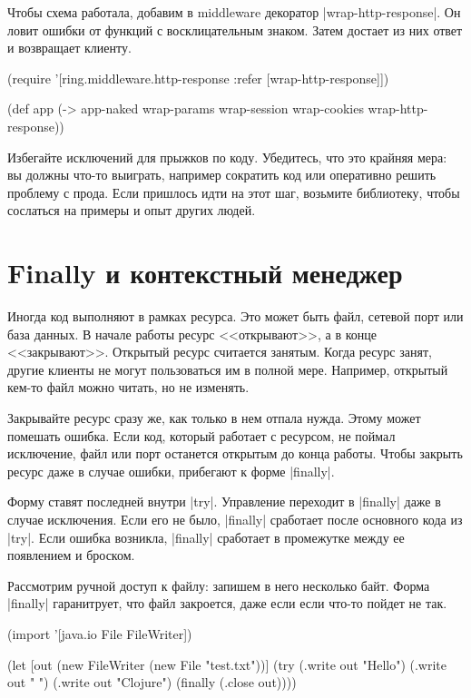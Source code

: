 Чтобы схема работала, добавим в middleware декоратор
\spverb|wrap-http-response|. Он ловит ошибки от функций с восклицательным
знаком. Затем достает из них ответ и возвращает клиенту.

\begin{english}
  \begin{clojure}
(require '[ring.middleware.http-response
           :refer [wrap-http-response]])

(def app
  (-> app-naked
      wrap-params
      wrap-session
      wrap-cookies
      wrap-http-response))
  \end{clojure}
\end{english}

Избегайте исключений для прыжков по коду. Убедитесь, что это крайняя мера: вы
должны что-то выиграть, например сократить код или оперативно решить проблему с
прода. Если пришлось идти на этот шаг, возьмите библиотеку, чтобы сослаться на
примеры и опыт других людей.

\section{Finally и контекстный менеджер}

Иногда код выполняют в рамках ресурса. Это может быть файл, сетевой порт или
база данных. В начале работы ресурс <<открывают>>, а в конце
<<закрывают>>. Открытый ресурс считается занятым. Когда ресурс занят, другие
клиенты не могут пользоваться им в полной мере. Например, открытый кем-то файл
можно читать, но не изменять.

Закрывайте ресурс сразу же, как только в нем отпала нужда. Этому может помешать
ошибка. Если код, который работает с ресурсом, не поймал исключение, файл или
порт останется открытым до конца работы. Чтобы закрыть ресурс даже в случае
ошибки, прибегают к форме \spverb|finally|.

Форму ставят последней внутри \spverb|try|. Управление переходит в
\spverb|finally| даже в случае исключения. Если его не было, \spverb|finally|
сработает после основного кода из \spverb|try|. Если ошибка возникла,
\spverb|finally| сработает в промежутке между ее появлением и броском.

Рассмотрим ручной доступ к файлу: запишем в него несколько байт. Форма
\spverb|finally| гаранитрует, что файл закроется, даже если если что-то пойдет
не так.

\begin{english}
  \begin{clojure}
(import '[java.io File FileWriter])

(let [out (new FileWriter (new File "test.txt"))]
  (try
    (.write out "Hello")
    (.write out " ")
    (.write out "Clojure")
    (finally
      (.close out))))
  \end{clojure}
\end{english}

